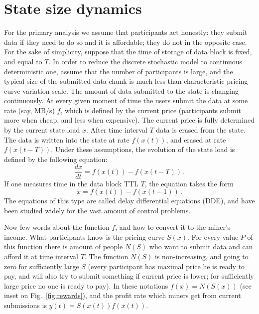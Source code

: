 \documentclass[]{llncs}   %
\begin{document}



\appendix

\section{State size dynamics}
\label{apx:statesize}
For the primary analysis we assume that participants act honestly: they submit
data if they need to do so and it is affordable; they do not in the opposite
case. For the sake of simplicity, suppose that the time of storage of data
block is fixed, and equal to $T$. In order to reduce the discrete stochastic
model to continuous deterministic one, assume that the number of participants
is large, and the typical size of the submitted data chunk is much less than
characteristic pricing curve variation scale. The amount of data submitted to
the state is changing continuously. At every given moment of time the users
submit the data at some rate (say, MB/s) $f$, which is defined by the current
price (participants submit more when cheap, and less when expensive). The
current price is fully determined by the current state load $x$. After time
interval $T$ data is erased from the state. The data is written into the state
at rate $f(x(t))$, and erased at rate $f(x(t-T))$. Under these assumptions,
the evolution of the state load is defined by the following equation:
\begin{equation}
    \frac{dx}{dt} = f(x(t))-f(x(t-T))\,.
    \label{eq:dde0}
\end{equation}
If one measures time in the data block TTL $T$, the equation takes the form
\begin{equation}
    \dot{x} = f(x(t))-f(x(t-1))\,.
    \label{eq:dde1}
\end{equation}
The equations of this type are called delay differential equations (DDE), and have
been studied widely for the vast amount of control problems.

Now few words about the function $f$, and how to convert it to the miner's
income. What participants know is the pricing curve $S(x)$. For every value $P$
of this function there is amount of people $N(S)$ who want to submit data and
can afford it at time interval $T$. The function $N(S)$ is non-increasing, and
going to zero for sufficiently large $S$ (every participant has maximal price he
is ready to pay, and will also try to submit something if current price is
lower; for sufficiently large price no one is ready to pay). In these notations
$f(x)=N(S(x))$ (see inset on Fig.~\ref{fig:rewards}), and the profit rate which
miners get from current submissions is $y(t) = S(x(t))f(x(t))$.
\end{document}
